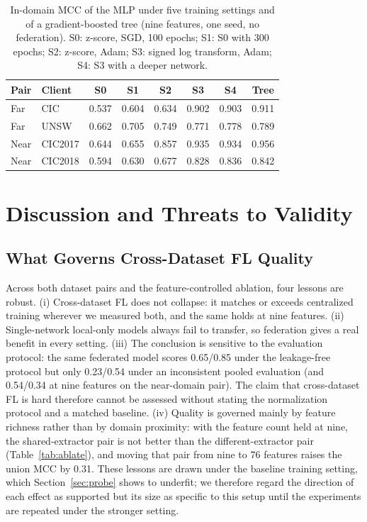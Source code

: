 \documentclass[conference,onecolumn]{IEEEtran}
\begin{document}
\begin{table}[htbp]
\caption{In-domain MCC of the MLP under five training settings and of a gradient-boosted tree (nine
features, one seed, no federation). S0: z-score, SGD, 100 epochs; S1: S0 with 300 epochs; S2: z-score,
Adam; S3: signed log transform, Adam; S4: S3 with a deeper network.}
\label{tab:probe}
\begin{center}
\footnotesize
\begin{tabular}{|l|l|c|c|c|c|c|c|}
\hline
\textbf{Pair} & \textbf{Client} & \textbf{S0} & \textbf{S1} & \textbf{S2} & \textbf{S3} & \textbf{S4} & \textbf{Tree} \\
\hline
Far  & CIC     & 0.537 & 0.604 & 0.634 & 0.902 & 0.903 & 0.911 \\
Far  & UNSW    & 0.662 & 0.705 & 0.749 & 0.771 & 0.778 & 0.789 \\
Near & CIC2017 & 0.644 & 0.655 & 0.857 & 0.935 & 0.934 & 0.956 \\
Near & CIC2018 & 0.594 & 0.630 & 0.677 & 0.828 & 0.836 & 0.842 \\
\hline
\end{tabular}
\end{center}
\end{table}

\section{Discussion and Threats to Validity}
\label{sec:discuss}

\subsection{What Governs Cross-Dataset FL Quality}
Across both dataset pairs and the feature-controlled ablation, four lessons are robust. (i)
Cross-dataset FL does not collapse: it matches or exceeds centralized training wherever we measured
both, and the same holds at nine features. (ii) Single-network local-only models always fail to
transfer, so federation gives a real benefit in every setting. (iii) The conclusion is sensitive to the
evaluation protocol: the same federated model scores 0.65/0.85 under the leakage-free protocol but only
0.23/0.54 under an inconsistent pooled evaluation (and 0.54/0.34 at nine features on the near-domain
pair). The claim that cross-dataset FL is hard \cite{b5} therefore cannot be assessed without stating
the normalization protocol and a matched baseline. (iv) Quality is governed mainly by feature richness
rather than by domain proximity: with the feature count held at nine, the shared-extractor pair is not
better than the different-extractor pair (Table~\ref{tab:ablate}), and moving that pair from nine to 76
features raises the union MCC by 0.31. These lessons are drawn under the baseline training setting, which
Section~\ref{sec:probe} shows to underfit; we therefore regard the direction of each effect as supported
but its size as specific to this setup until the experiments are repeated under the stronger setting.
\end{document}
